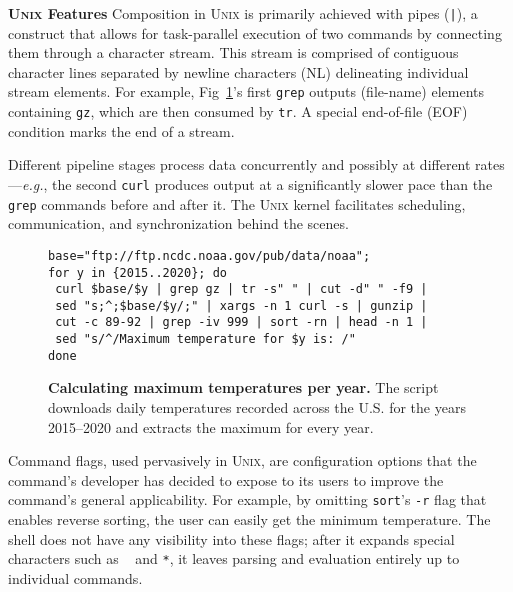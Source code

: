\documentclass[sigplan, review, screen, anonymous]{acmart}
\newcommand{\eg}{{\em e.g.}, }
\newcommand{\heading}[1]{\vspace{4pt}\noindent\textbf{#1}\enspace}
\newcommand{\ttt}[1]{\texttt{#1}}
\newcommand{\unix}{{\scshape Unix}\xspace}
\begin{document}
\heading{\unix Features}
Composition in \unix is primarily achieved with pipes (\ttt{|}), a
construct that allows for task-parallel execution of two commands by
connecting them through a character stream.
This stream is comprised of contiguous character lines separated by newline characters (\textsc{NL}) delineating individual stream elements.
For example, Fig~\ref{fig:example}'s first \ttt{grep} outputs (file-name) elements containing \ttt{gz}, which are then consumed by \ttt{tr}.
A special end-of-file (\textsc{EOF}) condition marks the end of a stream.

Different pipeline stages process data concurrently and possibly at different rates---\eg the second \ttt{curl} produces output at a significantly slower pace than the \ttt{grep} commands before and after it.
The \unix kernel facilitates scheduling, communication, and synchronization behind the scenes.

\begin{figure}[t]
\centering
\begin{verbatim}
base="ftp://ftp.ncdc.noaa.gov/pub/data/noaa";
for y in {2015..2020}; do
 curl $base/$y | grep gz | tr -s" " | cut -d" " -f9 |
 sed "s;^;$base/$y/;" | xargs -n 1 curl -s | gunzip |
 cut -c 89-92 | grep -iv 999 | sort -rn | head -n 1 |
 sed "s/^/Maximum temperature for $y is: /"
done
\end{verbatim}
\caption{
  \textbf{Calculating maximum temperatures per year.}
  The script downloads daily temperatures recorded across the U.S. for the years 2015--2020 and extracts the maximum for every year.
}
\vspace{-15pt}
\label{fig:example}
\end{figure}


Command flags, used pervasively in \unix, are configuration options that the command's developer has decided to expose to its users to improve the command's general applicability.
For example, by omitting  \ttt{sort}'s \ttt{-r} flag that enables reverse sorting, the user can easily get the minimum temperature.
The shell does not have any visibility into these flags; 
  after it expands special characters such as \ttt{~} and \ttt{*}, it leaves parsing and evaluation entirely up to individual commands.
\end{document}
